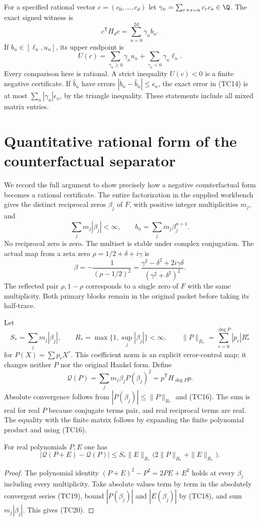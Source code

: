 For a specified rational vector $c=(c_0,\ldots,c_d)$ let
$\gamma_n=\sum_{r+s=n}c_rc_s\in\Q$. The exact signed witness is
\[
c^{\mathsf T}H_dc=\sum_{n=0}^{2d}\gamma_nb_n.
\tag{TC14}
\]
If $b_n\in[\ell_n,u_n]$, its upper endpoint is
\[
U(c)=
\sum_{\gamma_n\ge0}\gamma_nu_n
+\sum_{\gamma_n<0}\gamma_n\ell_n.
\tag{TC15}
\]
Every comparison here is rational. A strict inequality $U(c)<0$
is a finite negative certificate. If $\widehat b_n$ have errors
$|b_n-\widehat b_n|\le\epsilon_n$, the exact error in (TC14)
is at most $\sum_n|\gamma_n|\epsilon_n$, by the triangle
inequality. These statements include all mixed matrix entries.

\section{Quantitative rational form of the counterfactual separator}
We record the full argument to show precisely how a negative
counterfactual form becomes a rational certificate. The entire
factorization in the supplied workbench gives the distinct reciprocal
zeros $\beta_j$ of $F$, with positive integer multiplicities $m_j$,
and
\[
\sum_jm_j|\beta_j|<\infty,\qquad
b_n=\sum_jm_j\beta_j^{n+1}.
\tag{TC16}
\]
No reciprocal zero is zero. The multiset is stable under complex
conjugation. The actual map from a zeta zero
$\rho=1/2+\delta+i\gamma$ is
\[
\beta=-\frac{1}{(\rho-1/2)^2}
=\frac{\gamma^2-\delta^2+2i\gamma\delta}
{(\gamma^2+\delta^2)^2}.
\tag{TC17}
\]
The reflected pair $\rho,1-\rho$ corresponds to a single zero of
$F$ with the same multiplicity. Both primary blocks remain in
the original packet before taking its half-trace.

Let
\[
S_*=\sum_jm_j|\beta_j|,\qquad
R_*=\max\{1,\sup_j|\beta_j|\}<\infty,\qquad
\|P\|_{R_*}=\sum_{r=0}^{\deg P}|p_r|R_*^r
\tag{TC18}
\]
for $P(X)=\sum p_rX^r$. This coefficient norm is an explicit
error-control map; it changes neither $P$ nor the original Hankel
form. Define
\[
\mathcal Q(P)=\sum_jm_j\beta_jP(\beta_j)^2
=p^{\mathsf T}H_{\deg P}p.
\tag{TC19}
\]
Absolute convergence follows from
$|P(\beta_j)|\le\|P\|_{R_*}$ and (TC16). The sum is real for
real $P$ because conjugate terms pair, and real reciprocal terms
are real. The equality with the finite matrix follows by expanding
the finite polynomial product and using (TC16).

\begin{lemma}
For real polynomials $P,E$ one has
\[
|\mathcal Q(P+E)-\mathcal Q(P)|
\le S_*\|E\|_{R_*}\bigl(2\|P\|_{R_*}+\|E\|_{R_*}\bigr).
\tag{TC20}
\]
\end{lemma}
\begin{proof}
The polynomial identity $(P+E)^2-P^2=2PE+E^2$ holds at every
$\beta_j$ including every multiplicity. Take absolute values
term by term in the absolutely convergent series (TC19), bound
$|P(\beta_j)|$ and $|E(\beta_j)|$ by (TC18), and sum
$m_j|\beta_j|$. This gives (TC20).
\end{proof}

